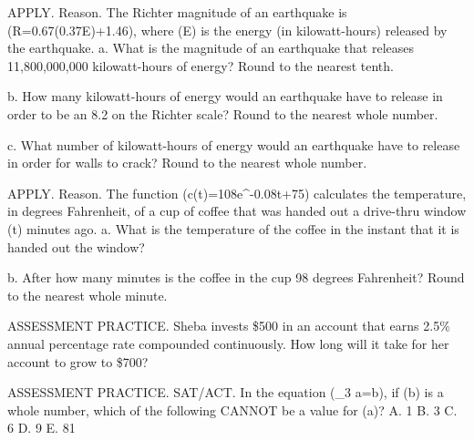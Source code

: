 \documentclass{article}
\newenvironment{practice}[2]{}{}        %
\newcommand{\answer}[1]{}               %
\newcommand{\placeholder}[2]{}          %
\begin{document}
\begin{practice}{54}{2}
APPLY. Reason. The Richter magnitude of an earthquake is (R=0.67\log(0.37E)+1.46), where (E) is the energy (in kilowatt-hours) released by the earthquake.
a. What is the magnitude of an earthquake that releases 11,800,000,000 kilowatt-hours of energy? Round to the nearest tenth.
\answer{a. magnitude 7.9}
b. How many kilowatt-hours of energy would an earthquake have to release in order to be an 8.2 on the Richter scale? Round to the nearest whole number.
\answer{b. 31,009,857,353 kWh}
c. What number of kilowatt-hours of energy would an earthquake have to release in order for walls to crack? Round to the nearest whole number.
\answer{c. 16,705 kWh}
\placeholder{photo}{Cracked plaster wall exposing bricks after an earthquake, callout ``At a richter magnitude of 4 and above, the walls in your house may start to crack.'' Black magnitude strip along bottom labeled Not felt at left and Extreme at right, integers 1 through 10 in colors white through yellow, orange and red; 4 circled red, linked to callout.}
\end{practice}
\begin{practice}{55}{2}
APPLY. Reason. The function (c(t)=108e^{-0.08t}+75) calculates the temperature, in degrees Fahrenheit, of a cup of coffee that was handed out a drive-thru window (t) minutes ago.
a. What is the temperature of the coffee in the instant that it is handed out the window?
\answer{a. (183^\circ\text{F})}
b. After how many minutes is the coffee in the cup 98 degrees Fahrenheit? Round to the nearest whole minute.
\answer{b. 19 minutes}
\end{practice}
\begin{practice}{56}{2}
ASSESSMENT PRACTICE. Sheba invests \$500 in an account that earns 2.5\% annual percentage rate compounded continuously. How long will it take for her account to grow to \$700?
\answer{about (13\frac12) years}
\end{practice}
\begin{practice}{57}{3}
ASSESSMENT PRACTICE. SAT/ACT. In the equation (\log_3 a=b), if (b) is a whole number, which of the following CANNOT be a value for (a)?
A. 1
B. 3
C. 6
D. 9
E. 81
\answer{C}
\end{practice}
\end{document}
